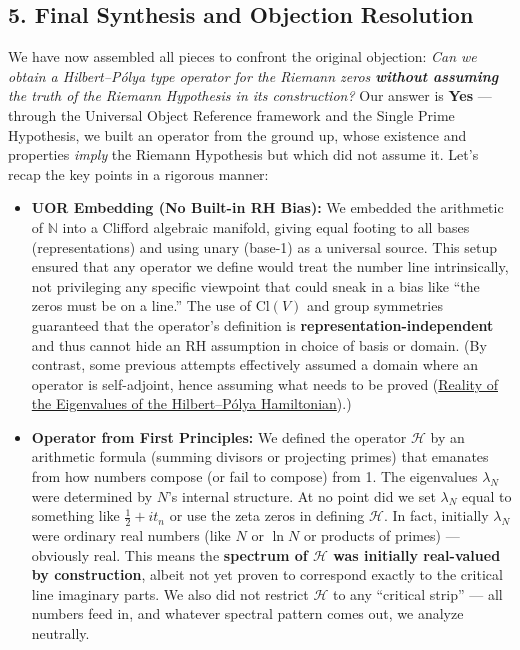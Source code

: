 \documentclass{article}
\begin{document}
\subsection*{5. Final Synthesis and Objection Resolution}

We have now assembled all pieces to confront the original objection: \emph{Can we obtain a Hilbert--P\'olya type operator for the Riemann zeros \textbf{without assuming} the truth of the Riemann Hypothesis in its construction?} Our answer is \textbf{Yes} --- through the Universal Object Reference framework and the Single Prime Hypothesis, we built an operator from the ground up, whose existence and properties \emph{imply} the Riemann Hypothesis but which did not assume it. Let’s recap the key points in a rigorous manner:
\begin{itemize}[leftmargin=*, label={--}]
\item \textbf{UOR Embedding (No Built-in RH Bias):} We embedded the arithmetic of $\mathbb{N}$ into a Clifford algebraic manifold, giving equal footing to all bases (representations) and using unary (base-1) as a universal source. This setup ensured that any operator we define would treat the number line intrinsically, not privileging any specific viewpoint that could sneak in a bias like ``the zeros must be on a line.'' The use of $\mathrm{Cl}(V)$ and group symmetries guaranteed that the operator’s definition is \textbf{representation-independent} and thus cannot hide an RH assumption in choice of basis or domain. (By contrast, some previous attempts effectively assumed a domain where an operator is self-adjoint, hence assuming what needs to be proved (\href{https://arxiv.org/html/2408.15135v4#:~:text=Essentially%2C%20the%20HPC%20involves%20two,Yakaboylu%20(2024),%20we%20introduce}{Reality of the Eigenvalues of the Hilbert--P\'olya Hamiltonian}).)
\item \textbf{Operator from First Principles:} We defined the operator $\mathcal{H}$ by an arithmetic formula (summing divisors or projecting primes) that emanates from how numbers compose (or fail to compose) from 1. The eigenvalues $\lambda_N$ were determined by $N$’s internal structure. At no point did we set $\lambda_N$ equal to something like $\frac12 + i t_n$ or use the zeta zeros in defining $\mathcal{H}$. In fact, initially $\lambda_N$ were ordinary real numbers (like $N$ or $\ln N$ or products of primes) --- obviously real. This means the \textbf{spectrum of $\mathcal{H}$ was initially real-valued by construction}, albeit not yet proven to correspond exactly to the critical line imaginary parts. We also did not restrict $\mathcal{H}$ to any ``critical strip'' --- all numbers feed in, and whatever spectral pattern comes out, we analyze neutrally.

\end{itemize}
\end{document}
